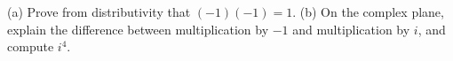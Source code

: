 (a) Prove from distributivity that $(-1)(-1)=1$. (b) On the complex plane, explain the difference between multiplication by $-1$ and multiplication by $i$, and compute $i^4$.
